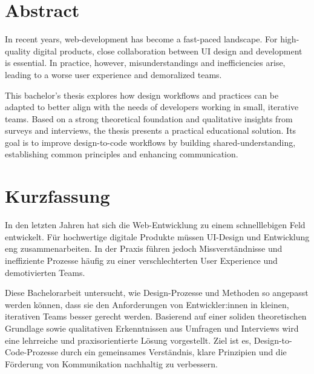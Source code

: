 \newpage
\section*{Abstract}
In recent years, web-development has become a fast-paced landscape. For high-quality digital
products, close collaboration between UI design and development is essential. In practice, however,
misunderstandings and inefficiencies arise, leading to a worse user experience and demoralized
teams.

This bachelor's thesis explores how design workflows and practices can be adapted to better align
with the needs of developers working in small, iterative teams. Based on a strong theoretical
foundation and qualitative insights from surveys and interviews, the thesis presents a practical
educational solution. Its goal is to improve design-to-code workflows by building
shared-understanding, establishing common principles and enhancing communication. 

\section*{Kurzfassung}
In den letzten Jahren hat sich die Web-Entwicklung zu einem schnelllebigen Feld entwickelt. Für
hochwertige digitale Produkte müssen UI-Design und Entwicklung eng zusammenarbeiten. In der Praxis
führen jedoch Missverständnisse und ineffiziente Prozesse häufig zu einer verschlechterten User
Experience und demotivierten Teams.

Diese Bachelorarbeit untersucht, wie Design-Prozesse und Methoden so angepasst werden können, dass
sie den Anforderungen von Entwickler:innen in kleinen, iterativen Teams besser gerecht werden.
Basierend auf einer soliden theoretischen Grundlage sowie qualitativen Erkenntnissen aus Umfragen
und Interviews wird eine lehrreiche und praxisorientierte Lösung vorgestellt. Ziel ist es,
Design-to-Code-Prozesse durch ein gemeinsames Verständnis, klare Prinzipien und die Förderung von
Kommunikation nachhaltig zu verbessern.
